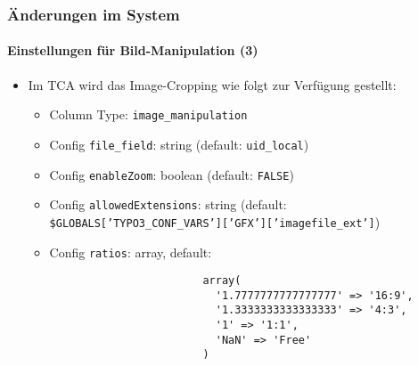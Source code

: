 \begin{frame}[fragile]
	\frametitle{Änderungen im System}
	\framesubtitle{Einstellungen für Bild-Manipulation (3)}

	\lstset{basicstyle=\smaller\ttfamily}

	\begin{itemize}
		\item Im TCA wird das Image-Cropping wie folgt zur Verfügung gestellt:

			\begin{itemize}
				\item Column Type: \texttt{image\_manipulation}
				\item Config \texttt{file\_field}: string	\tabto{5.6cm}(default: \texttt{uid\_local})
				\item Config \texttt{enableZoom}: boolean	\tabto{5.6cm}(default: \texttt{FALSE})
				\item Config \texttt{allowedExtensions}: string\newline
					(default: \smaller\texttt{\$GLOBALS['TYPO3\_CONF\_VARS']['GFX']['imagefile\_ext']}\small)
				\item Config \texttt{ratios}: array, default:

					\begin{lstlisting}
						array(
						  '1.7777777777777777' => '16:9',
						  '1.3333333333333333' => '4:3',
						  '1' => '1:1',
						  'NaN' => 'Free'
						)
					\end{lstlisting}
			\end{itemize}

	\end{itemize}

\end{frame}


